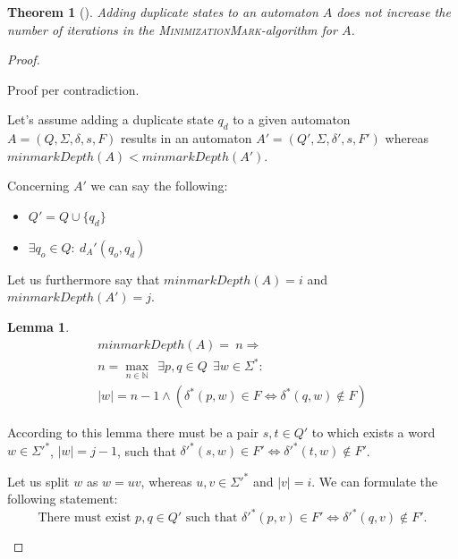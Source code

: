 \documentclass[a4paper, oneside, 11pt]{report}
\newtheorem{theorem}{Theorem}
\newtheorem{lemma}{Lemma}
\theoremstyle{definition}
\theoremstyle{remark}
\newcommand{\MinMark}{\textsc{MinimizationMark}}
\begin{document}
\begin{theorem}[]
	Adding duplicate states to an automaton $A$ does not increase the number of iterations in the \MinMark-algorithm for $A$.
\end{theorem}

\begin{proof}
	\begin{description}
		\item
		
		Proof per contradiction.
		
		Let's assume adding a duplicate state $q_d$ to a given automaton $A = (Q, \Sigma, \delta, s, F)$ results in an automaton $A' = (Q', \Sigma, \delta', s, F')$ whereas $minmarkDepth(A) < minmarkDepth(A')$.
		
		Concerning $A'$ we can say the following:
		\begin{itemize}
			\item $Q' = Q \cup \{ q_d \}$
			\item $\exists q_o \in Q \colon\ d_A'(q_o, q_d)$
		\end{itemize}
		Let us furthermore say that $minmarkDepth(A) = i$ and $minmarkDepth(A') = j$.
		
		\begin{lemma}
			\begin{multline*}
			minmarkDepth(A) =\ n \Rightarrow \\
			n = \max_{n \in \mathbb{N}}\ \ \exists p, q \in Q\ \ \exists w \in \Sigma^* \colon \\
			|w| = n - 1 \land (\delta^*(p,w) \in F \Leftrightarrow \delta^*(q,w) \notin F)
			\end{multline*}
		\end{lemma}
		According to this lemma there must be a pair $s, t \in Q'$ to which exists a word $w \in \Sigma'^*$, $|w| = j - 1$, such that $\delta'^*(s,w) \in F' \Leftrightarrow \delta'^*(t,w) \notin F'$.
		
		Let us split $w$ as $w = uv$, whereas $u,v \in\Sigma'^*$ and $|v| = i$. We can formulate the following statement:
		\begin{equation}
		\text{There must exist }p, q \in Q'\text{ such that }\delta'^*(p,v) \in F' \Leftrightarrow \delta'^*(q,v) \notin F'.
		\end{equation}
		

\end{description}
\end{proof}
\end{document}
